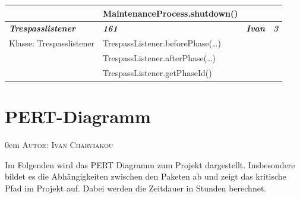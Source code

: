 \documentclass{article}
\makeatletter
\newcommand{\sectionauthor}[1]{
	{\parindent 0em \large \scshape Autor: #1 \par \nobreak \vspace*{1em}}
	\@afterheading
}
\makeatother
\begin{document}
\begin{longtable}{|l|l|l|l|}
\hline
                                        & MaintenanceProcess.shutdown()            &                             &                        \\ 
\hline
\textbf{\textit{Trespasslistener}}      & \textbf{\textit{161}}                    & \textbf{\textit{Ivan}}      & \textbf{\textit{3}}    \\ 
\hline
Klasse: Trespasslistener                & TrespassListener.beforePhase(…)          &                             &                        \\ 
\hline
                                        & TrespassListener.afterPhase(…)           &                             &                        \\ 
\hline
                                        & TrespassListener.getPhaseId()            &                             &                        \\
\hline
\end{longtable}




\section{PERT-Diagramm}
\sectionauthor{Ivan Charviakou}

Im Folgenden wird das PERT Diagramm zum Projekt dargestellt. Insbesondere bildet es die Abhängigkeiten zwischen den Paketen ab und zeigt das kritische Pfad im Projekt auf. Dabei werden die Zeitdauer in Stunden berechnet.
\end{document}
